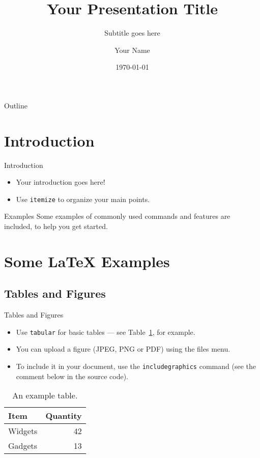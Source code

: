\documentclass{beamer}
\title{Your Presentation Title}
\subtitle{Subtitle goes here}
\author{Your Name}
\institute{Your Institution}
\date{\today}
\begin{document}
\begin{frame}
\titlepage
\end{frame}

\begin{frame}{Outline}
\tableofcontents
\end{frame}

\section{Introduction}

\begin{frame}{Introduction}
\begin{itemize}
    \item Your introduction goes here!
    \item Use \texttt{itemize} to organize your main points.
\end{itemize}

\vskip 1cm

\begin{block}{Examples}
Some examples of commonly used commands and features are included, to help you get started.
\end{block}

\end{frame}

\section{Some \LaTeX{} Examples}

\subsection{Tables and Figures}

\begin{frame}{Tables and Figures}
\begin{itemize}
\item Use \texttt{tabular} for basic tables --- see Table~\ref{tab:widgets}, for example.
\item You can upload a figure (JPEG, PNG or PDF) using the files menu. 
\item To include it in your document, use the \texttt{includegraphics} command (see the comment below in the source code).
\end{itemize}

\begin{table}
\centering
\begin{tabular}{l|r}
Item & Quantity \\\hline
Widgets & 42 \\
Gadgets & 13
\end{tabular}
\caption{\label{tab:widgets}An example table.}
\end{table}
\end{frame}
\end{document}
